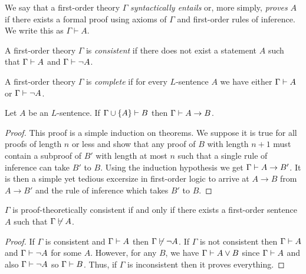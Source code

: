 \documentclass[12pt]{article}
\begin{document}
\begin{definition}
We say that a first-order theory $\Gamma$ \textit{syntactically entails} or, more simply, \textit{proves} $A$ if there exists a formal proof using axioms of $\Gamma$ and first-order rules of inference. We write this as $\Gamma \vdash A$.
\end{definition}

\begin{definition}
A first-order theory $\Gamma$ is \textit{consistent} if there does not exist a statement $A$ such that $\Gamma \vdash A$ and $\Gamma \vdash \neg A$. 
\end{definition}

\begin{definition}
A first-order theory $\Gamma$ is \textit{complete} if for every $L$-sentence $A$ we have either $\Gamma \vdash A$ or $\Gamma \vdash \neg A$. 
\end{definition}

\begin{lemma}[Deduction]
Let $A$ be an $L$-sentence. If $\Gamma \cup \{ A \} \vdash B$ then $\Gamma \vdash A \to B$. 
\end{lemma}

\begin{proof}
This proof is a simple induction on theorems. We suppose it is true for all proofs of length $n$ or less and show that any proof of $B$ with length $n+1$ must contain a subproof of $B'$ with length at most $n$ such that a single rule of inference can take $B'$ to $B$. Using the induction hypothesis we get $\Gamma \vdash A \to B'$. It is then a simple yet tedious excersize in first-order logic to arrive at $A \to B$ from $A \to B'$ and the rule of inference which takes $B'$ to $B$. 
\end{proof}

\begin{lemma}
$\Gamma$ is proof-theoretically consistent if and only if there exists a first-order sentence $A$ such that $\Gamma \not\vdash A$. 
\end{lemma}

\begin{proof}
If $\Gamma$ is consistent and $\Gamma \vdash A$ then $\Gamma \not\vdash \neg A$. If $\Gamma$ is not consistent then $\Gamma \vdash A$ and $\Gamma \vdash \neg A$ for some $A$. However, for any $B$, we have $\Gamma \vdash A \vee B$ since $\Gamma \vdash A$ and also $\Gamma \vdash \neg A$ so $\Gamma \vdash B$. Thus, if $\Gamma$ is inconsistent then it proves everything.  
\end{proof}
\end{document}
